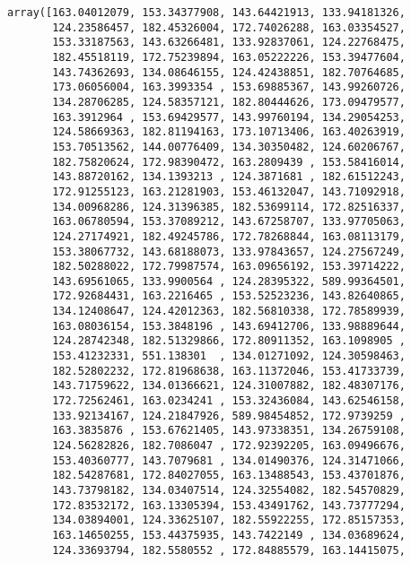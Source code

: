\documentclass[11pt]{article}
\makeatletter
\newcommand{\boxspacing}{\kern\kvtcb@left@rule\kern\kvtcb@boxsep}
\newcommand{\prompt}[4]{
        {\ttfamily\llap{{\color{#2}[#3]:\hspace{3pt}#4}}\vspace{-\baselineskip}}
    }
\makeatother
\begin{document}
            \begin{tcolorbox}[breakable, size=fbox, boxrule=.5pt, pad at break*=1mm, opacityfill=0]
\prompt{Out}{outcolor}{104}{\boxspacing}
\begin{Verbatim}[commandchars=\\\{\}]
array([163.04012079, 153.34377908, 143.64421913, 133.94181326,
       124.23586457, 182.45326004, 172.74026288, 163.03354527,
       153.33187563, 143.63266481, 133.92837061, 124.22768475,
       182.45518119, 172.75239894, 163.05222226, 153.39477604,
       143.74362693, 134.08646155, 124.42438851, 182.70764685,
       173.06056004, 163.3993354 , 153.69885367, 143.99260726,
       134.28706285, 124.58357121, 182.80444626, 173.09479577,
       163.3912964 , 153.69429577, 143.99760194, 134.29054253,
       124.58669363, 182.81194163, 173.10713406, 163.40263919,
       153.70513562, 144.00776409, 134.30350482, 124.60206767,
       182.75820624, 172.98390472, 163.2809439 , 153.58416014,
       143.88720162, 134.1393213 , 124.3871681 , 182.61512243,
       172.91255123, 163.21281903, 153.46132047, 143.71092918,
       134.00968286, 124.31396385, 182.53699114, 172.82516337,
       163.06780594, 153.37089212, 143.67258707, 133.97705063,
       124.27174921, 182.49245786, 172.78268844, 163.08113179,
       153.38067732, 143.68188073, 133.97843657, 124.27567249,
       182.50288022, 172.79987574, 163.09656192, 153.39714222,
       143.69561065, 133.9900564 , 124.28395322, 589.99364501,
       172.92684431, 163.2216465 , 153.52523236, 143.82640865,
       134.12408647, 124.42012363, 182.56810338, 172.78589939,
       163.08036154, 153.3848196 , 143.69412706, 133.98889644,
       124.28742348, 182.51329866, 172.80911352, 163.1098905 ,
       153.41232331, 551.138301  , 134.01271092, 124.30598463,
       182.52802232, 172.81968638, 163.11372046, 153.41733739,
       143.71759622, 134.01366621, 124.31007882, 182.48307176,
       172.72562461, 163.0234241 , 153.32436084, 143.62546158,
       133.92134167, 124.21847926, 589.98454852, 172.9739259 ,
       163.3835876 , 153.67621405, 143.97338351, 134.26759108,
       124.56282826, 182.7086047 , 172.92392205, 163.09496676,
       153.40360777, 143.7079681 , 134.01490376, 124.31471066,
       182.54287681, 172.84027055, 163.13488543, 153.43701876,
       143.73798182, 134.03407514, 124.32554082, 182.54570829,
       172.83532172, 163.13305394, 153.43491762, 143.73777294,
       134.03894001, 124.33625107, 182.55922255, 172.85157353,
       163.14650255, 153.44375935, 143.7422149 , 134.03689624,
       124.33693794, 182.5580552 , 172.84885579, 163.14415075,

\end{Verbatim}
\end{tcolorbox}
\end{document}
